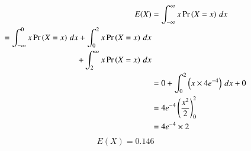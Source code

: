 \documentclass[journal,12pt,twocolumn]{IEEEtran}
\begin{document}
\begin{align}
    E(X) &= \int_{- \infty}^{\infty} x \Pr\left(X=x\right) \,dx \\
    \begin{split}
     = \int_{- \infty}^0 x \Pr\left(X=x\right) \,dx + \int_0^2 x \Pr\left(X=x\right) \,dx \\
     + \int_2^{\infty} x \Pr\left(X=x\right) \,dx
    \end{split} \\
    &= 0 + \int_0^2 \left(x \times 4e^{-4}\right) \,dx + 0 \\
    &= 4e^{-4}\left(\frac{x^2}{2}\right)_0^2 \\
    &= 4e^{-4} \times 2 \\
\end{align}
\begin{equation}
    \boxed{E(X) = 0.146}
\end{equation}
\end{document}
